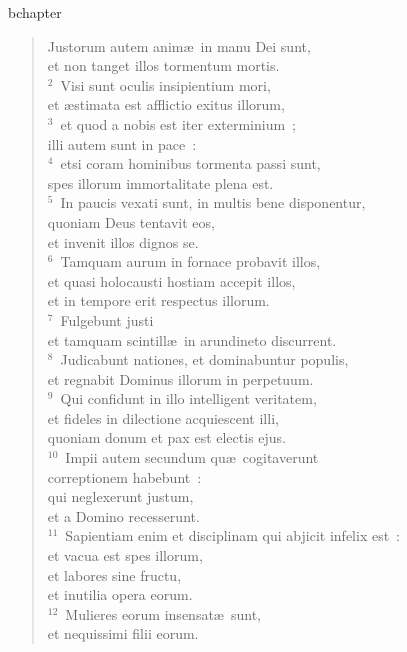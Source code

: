 bchapter\begin{verse}\vspace{-19pt}Justorum autem anim\ae\ in manu Dei sunt,\\ et non tanget illos tormentum mortis.\\
${}^{2}$~Visi sunt oculis insipientium mori,\\ et \ae stimata est afflictio exitus illorum,\\
${}^{3}$~et quod a nobis est iter exterminium~;\\ illi autem sunt in pace~:\\
${}^{4}$~etsi coram hominibus tormenta passi sunt,\\ spes illorum immortalitate plena est.\\
${}^{5}$~In paucis vexati sunt, in multis bene disponentur,\\ quoniam Deus tentavit eos,\\ et invenit illos dignos se.\\
${}^{6}$~Tamquam aurum in fornace probavit illos,\\ et quasi holocausti hostiam accepit illos,\\ et in tempore erit respectus illorum.\\
${}^{7}$~Fulgebunt justi\\ et tamquam scintill\ae\ in arundineto discurrent.\\
${}^{8}$~Judicabunt nationes, et dominabuntur populis,\\ et regnabit Dominus illorum in perpetuum.\\
${}^{9}$~Qui confidunt in illo intelligent veritatem,\\ et fideles in dilectione acquiescent illi,\\ quoniam donum et pax est electis ejus.\\
${}^{10}$~Impii autem secundum qu\ae\ cogitaverunt\\ correptionem habebunt~:\\ qui neglexerunt justum,\\ et a Domino recesserunt.\\
${}^{11}$~Sapientiam enim et disciplinam qui abjicit infelix est~:\\ et vacua est spes illorum,\\ et labores sine fructu,\\ et inutilia opera eorum.\\
${}^{12}$~Mulieres eorum insensat\ae\ sunt,\\ et nequissimi filii eorum.\\

\end{verse}
